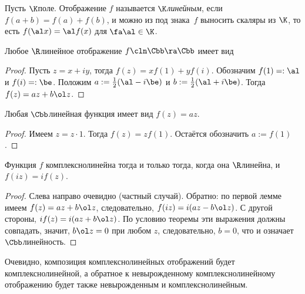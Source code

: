 \documentclass[a4paper]{article}
\begin{document}
\begin{df}
Пусть $\K$\т поле. Отображение $f$ называется \emph{$\K$\д линейным}, если $f(a+b)=f(a)+f(b)$, и можно из под знака~$f$
выносить скаляры из $\K$, то есть $f(\al x)=\al f(x)$ для $\fa \al \in \K$.
\end{df}

\begin{lemma}
Любое $\R$\д линейное отображение $f\cln\Cbb\ra\Cbb$ имеет вид
\end{lemma}
\begin{proof}
Пусть $z=x+iy$, тогда $f(z)=xf(1)+yf(i)$. Обозначим $f(1) =: \al$ и $f(i) =: \be$. Положим $a := \frac12(\al-i\be)$ и
$b := \frac12(\al+i\be)$. Тогда $f(z) = az+b\ol z$.
\end{proof}

\begin{lemma}
Любая $\Cbb$\д линейная функция имеет вид $f(z)=az$.
\end{lemma}
\begin{proof}
Имеем $z = z \cdot 1$. Тогда $f(z)=zf(1)$. Остаётся обозначить $a := f(1)$.
\end{proof}

\begin{theorem}
Функция $f$ комплексно\д линейна тогда и только тогда, когда она $\R$\д линейна, и $f(iz)=if(z)$.
\end{theorem}
\begin{proof}
Слева направо \т очевидно (частный случай). Обратно: по первой лемме имеем $f(z)=az+b\ol z$, следовательно,
$f(iz)=i(az-b\ol z)$. С другой стороны, $i f(z)=i(az+b\ol z)$.
По условию теоремы эти выражения должны совпадать, значит, $b\ol z = 0$ при любом $z$, следовательно, $b=0$, что и
означает $\Cbb$\д линейность.
\end{proof}

Очевидно, композиция комплексно\д линейных отображений будет комплексно\д линейной, а обратное к невырожденному
комплексно\д линейному отображению будет также невырожденным и комплексно\д линейным.
\end{document}
